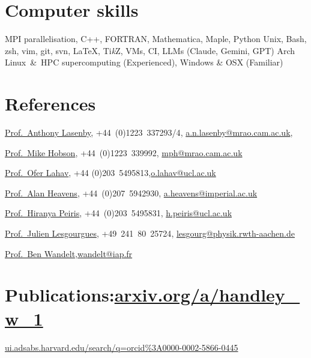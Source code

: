 \documentclass[11pt,a4paper,sans]{moderncv}
\begin{document}
\section{Computer skills}
 {MPI parallelisation, C++, FORTRAN, Mathematica, Maple, Python}
   {Unix, Bash, zsh, vim, git, svn, \LaTeX, Ti\textit{k}Z, VMs, CI, LLMs (Claude, Gemini, GPT)}
          {Arch Linux~\&~HPC supercomputing (Experienced), Windows \& OSX (Familiar)}


\section{References}
\href{https://www.kicc.cam.ac.uk/directory/anl1000}{Prof.\ Anthony Lasenby}, {+44~(0)1223~337293/4}, \href{mailto:a.n.lasenby@mrao.cam.ac.uk}{a.n.lasenby@mrao.cam.ac.uk}, 

\href{https://www.phy.cam.ac.uk/directory/hobsonm}{Prof.\ Mike Hobson}, {+44~(0)1223~339992}, \href{mailto:mph@mrao.cam.ac.uk}{mph@mrao.cam.ac.uk} 


\href{https://www.ucl.ac.uk/astrophysics/professor-ofer-lahav}{Prof.\ Ofer Lahav}, {+44 (0)203~5495813},\href{mailto:o.lahav@ucl.ac.uk}{o.lahav@ucl.ac.uk} 

\href{https://www.imperial.ac.uk/people/a.heavens}{Prof.\ Alan Heavens}, {+44~(0)207~5942930}, \href{mailto:a.heavens@imperial.ac.uk}{a.heavens@imperial.ac.uk} 


\href{https://www.ucl.ac.uk/cosmoparticle/hiranya-peiris}{Prof.\ Hiranya Peiris}, {+44~(0)203~5495831}, \href{mailto:h.peiris@ucl.ac.uk}{h.peiris@ucl.ac.uk} 

\href{https://www.particle-theory.rwth-aachen.de/go/id/gufe/lidx/1}{Prof.\ Julien Lesgourgues}, {+49~241~80~25724}, \href{mailto:lesgourg@physik.rwth-aachen.de}{lesgourg@physik.rwth-aachen.de} 

\href{https://benwandelt.org/}{Prof.\ Ben Wandelt},\href{mailto:wandelt@iap.fr}{wandelt@iap.fr} 

\pagebreak
\section{Publications:\hfill  \href{https://www.arxiv.org/a/handley_w_1.html}{arxiv.org/a/handley\_w\_1}}

\hfill \href{https://ui.adsabs.harvard.edu/search/q=orcid\%3A0000-0002-5866-0445}{ui.adsabs.harvard.edu/search/q=orcid\%3A0000-0002-5866-0445}

\vspace{-10pt}
\end{document}
